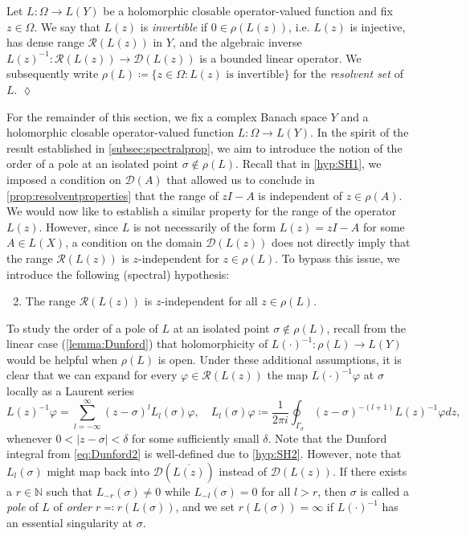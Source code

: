 \documentclass[english]{myarticle}
\begin{document}
\begin{sloppypar}
\begin{definition} \label{def:spectrum_characop} 
Let $L: \Omega \to L(Y)$ be a holomorphic closable operator-valued function and fix $z \in \Omega$. We say that $L(z)$ is \emph{invertible} if $0 \in \rho(L(z))$, i.e. $L(z)$ is injective, has dense range $\mathcal{R}(L(z))$ in $Y$, and the algebraic inverse $L(z)^{-1}: \mathcal{R}(L(z)) \to \mathcal{D}(L(z))$ is a bounded linear operator. We subsequently write $\rho(L) \coloneqq \{ z \in \Omega : L(z) \mbox{ is invertible} \}$ for the \emph{resolvent set} of $L$. \hfill $\lozenge$
\end{definition}

For the remainder of this section, we fix a complex Banach space $Y$ and a holomorphic closable operator-valued function $L : \Omega \to L(Y)$. In the spirit of the result established in \cref{subsec:spectralprop}, we aim to introduce the notion of the order of a pole at an isolated point $\sigma \notin \rho(L)$. Recall that in \ref{hyp:SH1}, we imposed a condition on $\mathcal{D}(A)$ that allowed us to conclude in \cref{prop:resolventproperties} that the range of $zI-A$ is independent of $z \in \rho(A)$. We would now like to establish a similar property for the range of the operator $L(z)$. However, since $L$ is not necessarily of the form $L(z) = zI-A$ for some $A \in L(X)$, a condition on the domain $\mathcal{D}(L(z))$ does not directly imply that the range $\mathcal{R}(L(z))$ is $z$-independent for $z \in \rho(L)$. To bypass this issue, we introduce the following (spectral) hypothesis:

\begin{enumerate}[label=({SH}{{\arabic*}})] 
\setcounter{enumi}{1}
    \item \label{hyp:SH2} 
    The range $\mathcal{R}(L(z))$ is $z$-independent for all $z \in \rho(L)$.
\end{enumerate}
To study the order of a pole of $L$ at an isolated point $\sigma \notin \rho(L)$, recall from the linear case (\cref{lemma:Dunford}) that holomorphicity of $L(\cdot)^{-1} : \rho(L) \to L(Y)$ would be helpful when $\rho(L)$ is open. Under these additional assumptions, it is clear that we can expand for every $\varphi \in \mathcal{R}(L(z))$ the map $L(\cdot)^{-1} \varphi$ at $\sigma$ locally as a Laurent series
\begin{equation} \label{eq:Dunford2}
    L(z)^{-1} \varphi = \sum_{l = -\infty}^{\infty} (z - \sigma)^l L_l(\sigma) \varphi, \quad L_l(\sigma)\varphi \coloneqq \frac{1}{2 \pi i} \oint_{\Gamma_{\sigma}} (z-\sigma)^{-(l+1)} L(z)^{-1} \varphi dz,
\end{equation}
whenever $0 < |z-\sigma| < \delta$ for some sufficiently small $\delta$. Note that the Dunford integral from \eqref{eq:Dunford2} is well-defined due to \ref{hyp:SH2}. However, note that $L_l(\sigma)$ might map back into $\mathcal{D}(\overline{L(z)})$ instead of $\mathcal{D}(L(z))$. If there exists a $r \in \mathbb{N}$ such that $L_{-r}(\sigma) \neq 0$ while $L_{-l}(\sigma) = 0$ for all $l > r$, then $\sigma$ is called a \emph{pole} of $L$ of \emph{order} $r \eqqcolon r(L(\sigma))$, and we set $r(L(\sigma)) = \infty$ if $L(\cdot)^{-1}$ has an essential singularity at $\sigma$.


\end{sloppypar}
\end{document}
